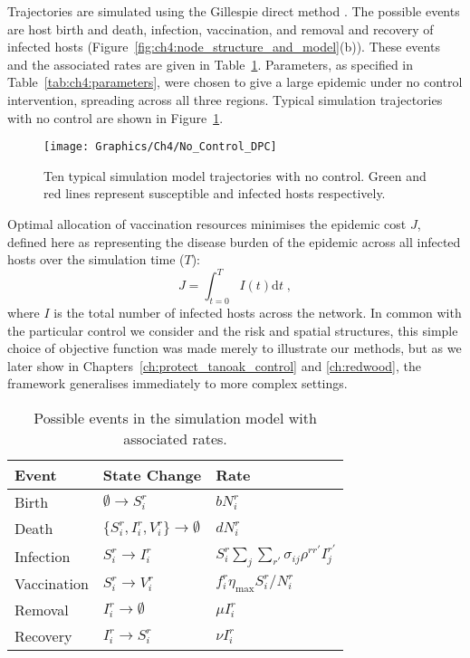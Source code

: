 Trajectories are simulated using the Gillespie direct method \citep{gillespie_exact_1977}. The possible events are host birth and death, infection, vaccination, and removal and recovery of infected hosts (Figure~\ref{fig:ch4:node_structure_and_model}(b)). These events and the associated rates are given in Table~\ref{tab:ch4:rates}. Parameters, as specified in Table~\ref{tab:ch4:parameters}, were chosen to give a large epidemic under no control intervention, spreading across all three regions. Typical simulation trajectories with no control are shown in Figure~\ref{fig:ch4:no_control_dpc}.

\begin{figure}[htb]
    \begin{center}
        \texttt{[image: Graphics/Ch4/No\_Control\_DPC]}
        \caption[Uncontrolled network model dynamics]{Ten typical simulation model trajectories with no control. Green and red lines represent susceptible and infected hosts respectively.\label{fig:ch4:no_control_dpc}}
    \end{center}
\end{figure}

Optimal allocation of vaccination resources minimises the epidemic cost $J$, defined here as representing the disease burden of the epidemic across all infected hosts over the simulation time ($T$):
\begin{equation}
    J = \int_{t=0}^TI(t)\mathrm{d}t\;,
\end{equation}
where $I$ is the total number of infected hosts across the network. In common with the particular control we consider and the risk and spatial structures, this simple choice of objective function was made merely to illustrate our methods, but as we later show in Chapters~\ref{ch:protect_tanoak_control} and \ref{ch:redwood}, the framework generalises immediately to more complex settings.

\begin{table}
    \centering
    \caption[Possible events in the simulation model]{Possible events in the simulation model with associated rates.\label{tab:ch4:rates}}
    \begin{tabular}{@{}lll@{}}
        \toprule
        \textbf{Event} & \textbf{State Change} & \textbf{Rate} \\
        \midrule
        Birth & $\emptyset \rightarrow S_i^r$ & $bN_i^r$\\
        Death & $\{S_i^r,I_i^r,V_i^r\} \rightarrow \emptyset$ & $dN_i^r$ \\
        Infection & $S_i^r \rightarrow I_i^r$ & $S_i^r\sum_{j}\sum_{r'}\sigma_{ij}\rho^{rr'}I_j^{r'}$\\
        Vaccination & $S_i^r \rightarrow V_i^r$ & $f_i^r\eta_{\textrm{max}}S_i^r / N_i^r$\\
        Removal & $I_i^r \rightarrow \emptyset$ & $\mu{}I_i^r$\\
        Recovery & $I_i^r \rightarrow S_i^r$ & $\nu{}I_i^r$\\
        \bottomrule
    \end{tabular}
\end{table}
        
